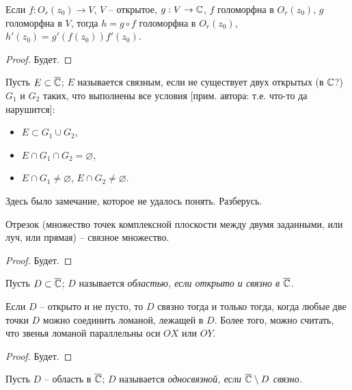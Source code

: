 \begin{proposition}
	Если $f: O_r(z_0) \to V$, $V$ -- открытое, $g: V \to \mathbb{C}$, $f$ голоморфна в $O_r(z_0)$, $g$ голоморфна в $V$, тогда $h = g \circ f$ голоморфна в $O_r(z_0)$, $h'(z_0) = g'(f(z_0)) f'(z_0)$.
\end{proposition}
\begin{proof}
	Будет.
\end{proof}

\begin{definition}
	Пусть $E \subset \overline {\mathbb{C}}$; $E$ называется связным, если не существует двух открытых (в $\mathbb{C}$?) $G_1$ и $G_2$ таких, что выполнены все условия [прим. автора: т.е. что-то да нарушится]:
	\begin{itemize}
		\item $E \subset G_1 \cup G_2$,
		\item $E \cap G_1 \cap G_2 = \varnothing$,
		\item $E \cap G_1 \neq \varnothing$, $E \cap G_2 \neq \varnothing$.
	\end{itemize}
\end{definition}

{\color{gray} Здесь было замечание, которое не удалось понять. Разберусь.} %

\begin{proposition}
	Отрезок (множество точек комплексной плоскости между двумя заданными, или луч, или прямая) -- связное множество.
\end{proposition}
\begin{proof}
	Будет.
\end{proof}

\begin{proposition}
	Пусть $D \subset \overline {\mathbb{C}}$; $D$ называется \it{областью}, если открыто и связно в $\overline {\mathbb{C}}$.
\end{proposition}

\begin{theorem}
	Если $D$ -- открыто и не пусто, то $D$ связно тогда и только тогда, когда любые две точки $D$ можно соединить ломаной, лежащей в $D$. Более того, можно считать, что звенья ломаной параллельны оси $OX$ или $OY$.
\end{theorem}
\begin{proof}
	Будет.
\end{proof}

\begin{definition}
	Пусть $D$ -- область в $\overline {\mathbb{C}}$; $D$ называется \it{односвязной}, если $\overline {\mathbb{C}} \setminus D$ связно.
\end{definition}

